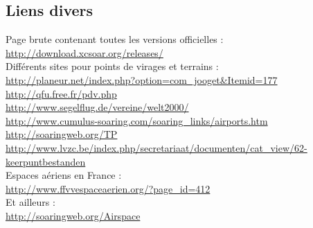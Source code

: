 \documentclass{article}
\begin{document}
\subsection{Liens divers}
\noindent
\label{LiensDivers}
Page brute contenant toutes les versions officielles :\\ \url{http://download.xcsoar.org/releases/}\\
\newline
Différents sites pour points de virages et terrains :\\
\url{http://planeur.net/index.php?option=com_jooget&Itemid=177}\\
\url{http://qfu.free.fr/pdv.php}\\
\url{http://www.segelflug.de/vereine/welt2000/}\\
\url{http://www.cumulus-soaring.com/soaring_links/airports.htm}\\
\url{http://soaringweb.org/TP}\\
\url{http://www.lvzc.be/index.php/secretariaat/documenten/cat_view/62-keerpuntbestanden}\\
\newline
Espaces aériens en France :\\
\url{http://www.ffvvespaceaerien.org/?page_id=412}\\
Et ailleurs :\\
\url{http://soaringweb.org/Airspace}\\
%
\end{document}

